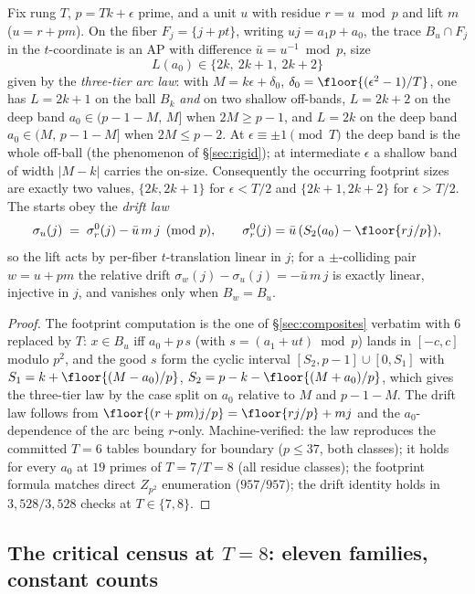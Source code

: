 \begin{lemma}
\label{lem:rungT}
Fix rung $T$, $p=Tk+\epsilon$ prime, and a unit $u$ with residue
$r=u\bmod p$ and lift $m$ ($u=r+pm$). On the fiber $F_j=\{j+pt\}$, writing
$uj=a_1p+a_0$, the trace $B_u\cap F_j$ in the $t$-coordinate is an AP
with difference $\bar u=u^{-1}\bmod p$, size
\[
L(a_0)\in\{2k,\ 2k+1,\ 2k+2\}
\]
given by the \emph{three-tier arc law}: with $M=k\epsilon+\delta_0$,
$\delta_0=\floor{(\epsilon^2-1)/T}$, one has $L=2k+1$ on the ball $B_k$
\emph{and} on two shallow off-bands, $L=2k+2$ on the deep band
$a_0\in(p-1-M,\,M]$ when $2M\ge p-1$, and $L=2k$ on the deep band
$a_0\in(M,\,p-1-M]$ when $2M\le p-2$. At $\epsilon\equiv\pm1\pmod T$ the
deep band is the whole off-ball (the phenomenon of \S\ref{sec:rigid});
at intermediate $\epsilon$ a shallow band of width $|M-k|$ carries the
on-size. Consequently the occurring footprint sizes are exactly two
values, $\{2k,2k+1\}$ for $\epsilon<T/2$ and $\{2k+1,2k+2\}$ for
$\epsilon>T/2$. The starts obey the \emph{drift law}
\[
\sigma_u(j)\;=\;\sigma_r^0(j)-\bar u\,m\,j\pmod p,
\qquad \sigma_r^0(j)=\bar u\,(S_2(a_0)-\floor{rj/p}),
\]
so the lift acts by per-fiber $t$-translation linear in $j$; for a
$\pm$-colliding pair $w=u+pm$ the relative drift
$\sigma_w(j)-\sigma_u(j)=-\bar u\,m\,j$ is exactly linear, injective in
$j$, and vanishes only when $B_w=B_u$.
\end{lemma}

\begin{proof}
The footprint computation is the one of \S\ref{sec:composites} verbatim
with $6$ replaced by $T$: $x\in B_u$ iff $a_0+p\,s$ (with
$s=(a_1+ut)\bmod p$) lands in $[-c,c]$ modulo $p^2$, and the good $s$
form the cyclic interval $[S_2,p-1]\cup[0,S_1]$ with
$S_1=k+\floor{(M-a_0)/p}$, $S_2=p-k-\floor{(M+a_0)/p}$, which gives the
three-tier law by the case split on $a_0$ relative to $M$ and $p-1-M$.
The drift law follows from $\floor{(r+pm)j/p}=\floor{rj/p}+mj$ and the
$a_0$-dependence of the arc being $r$-only. Machine-verified: the law
reproduces the committed $T=6$ tables boundary for boundary
($p\le37$, both classes); it holds for every $a_0$ at $19$ primes of
$T=7/T=8$ (all residue classes); the footprint formula matches direct
$Z_{p^2}$ enumeration ($957/957$); the drift identity holds in
$3{,}528/3{,}528$ checks at $T\in\{7,8\}$.
\end{proof}

\subsection{The critical census at \texorpdfstring{$T=8$}{T=8}: eleven families, constant counts}

